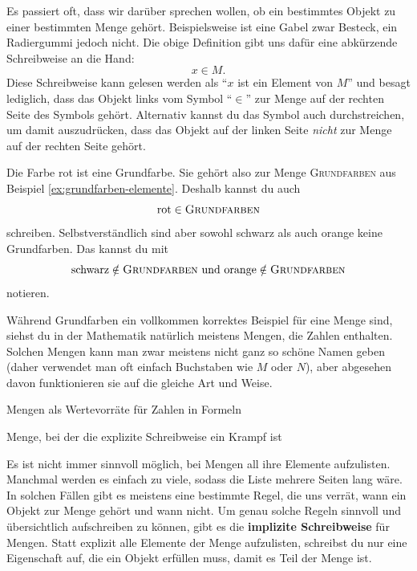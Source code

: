 \documentclass[../../main.tex]{subfiles}
\begin{document}
Es passiert oft, dass wir darüber sprechen wollen, ob ein bestimmtes Objekt zu einer bestimmten Menge gehört. Beispielsweise ist eine Gabel zwar Besteck, ein Radiergummi jedoch nicht. Die obige Definition gibt uns dafür eine abkürzende Schreibweise an die Hand:
\[x\in M.\]
Diese Schreibweise kann gelesen werden als \enquote{$x$ ist ein Element von $M$} und besagt lediglich, dass das Objekt links vom Symbol \enquote{$\in$} zur Menge auf der rechten Seite des Symbols gehört. Alternativ kannst du das Symbol auch durchstreichen, um damit auszudrücken, dass das Objekt auf der linken Seite \emph{nicht} zur Menge auf der rechten Seite gehört.

\begin{example}{}
    Die Farbe rot ist eine Grundfarbe. Sie gehört also zur Menge \textsc{Grundfarben} aus Beispiel \ref{ex:grundfarben-elemente}. Deshalb kannst du auch
    \[\text{rot}\in\textsc{Grundfarben}\]
    schreiben. Selbstverständlich sind aber sowohl schwarz als auch orange keine Grundfarben. Das kannst du mit
    \[\text{schwarz}\notin\textsc{Grundfarben}~\text{und}~\text{orange}\notin\textsc{Grundfarben}\]
    notieren.
\end{example}

Während Grundfarben ein vollkommen korrektes Beispiel für eine Menge sind, siehst du in der Mathematik natürlich meistens Mengen, die Zahlen enthalten. Solchen Mengen kann man zwar meistens nicht ganz so schöne Namen geben (daher verwendet man oft einfach Buchstaben wie $M$ oder $N$), aber abgesehen davon funktionieren sie auf die gleiche Art und Weise.

\begin{example}{}
    Mengen als Wertevorräte für Zahlen in Formeln
\end{example}

\begin{example}{}
    Menge, bei der die explizite Schreibweise ein Krampf ist
\end{example}

Es ist nicht immer sinnvoll möglich, bei Mengen all ihre Elemente aufzulisten. Manchmal werden es einfach zu viele, sodass die Liste mehrere Seiten lang wäre. In solchen Fällen gibt es meistens eine bestimmte Regel, die uns verrät, wann ein Objekt zur Menge gehört und wann nicht. Um genau solche Regeln sinnvoll und übersichtlich aufschreiben zu können, gibt es die \textbf{implizite Schreibweise} für Mengen. Statt explizit alle Elemente der Menge aufzulisten, schreibst du nur eine Eigenschaft auf, die ein Objekt erfüllen muss, damit es Teil der Menge ist.
\end{document}
